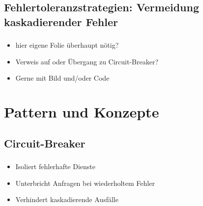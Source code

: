 \subsection{Fehlertoleranzstrategien: Vermeidung kaskadierender Fehler}
\begin{frame}
    \frametitle{\insertsection}
    \framesubtitle{\insertsubsection}

    \begin{itemize}
        \item hier eigene Folie überhaupt nötig?
        \item Verweis auf oder Übergang zu Circuit-Breaker?
        \item Gerne mit Bild und/oder Code
    \end{itemize}
\end{frame}


\section{Pattern und Konzepte}
\subsection{\textbf{Circuit-Breaker}}

\begin{frame}
    \frametitle{\insertsection}
    \framesubtitle{\insertsubsection}

    \begin{itemize}
        \item Isoliert fehlerhafte Dienste
        \item Unterbricht Anfragen bei wiederholtem Fehler
        \item Verhindert kaskadierende Ausfälle
    \end{itemize}
\end{frame}

